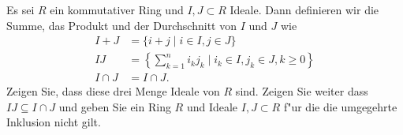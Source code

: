 \documentclass[a4,11pt]{article}
\begin{document}
\begin{aufgabe}

Es sei $R$ ein kommutativer Ring und $I, J \subset R$ Ideale. Dann definieren wir die Summe, das Produkt und der Durchschnitt von $I$ und $J$ wie
\begin{align*}
I + J &= \{ i + j \mid i \in I, j \in J \}\\
IJ &= \left\{ \sum_{k = 1}^n i_k j_k \mid i_k \in I, j_k \in J, k \geq 0 \right\}\\
I \cap J &= I \cap J.
\end{align*}
Zeigen Sie, dass diese drei Menge Ideale von $R$ sind. Zeigen Sie weiter dass $IJ \subseteq I \cap J$ und geben Sie ein Ring $R$ und Ideale $I, J \subset R$ f"ur die die umgegehrte Inklusion nicht gilt.  
\end{aufgabe}
\end{document}
